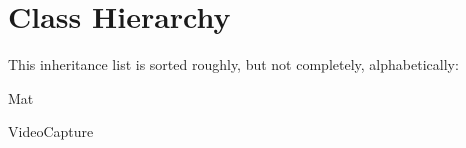 \section{Class Hierarchy}
This inheritance list is sorted roughly, but not completely, alphabetically\+:\begin{DoxyCompactList}
\item {}
\item {}
\item {}
\item Mat\begin{DoxyCompactList}
\item {}
\end{DoxyCompactList}
\item {}
\item Video\+Capture\begin{DoxyCompactList}
\item {}
\end{DoxyCompactList}
\end{DoxyCompactList}
